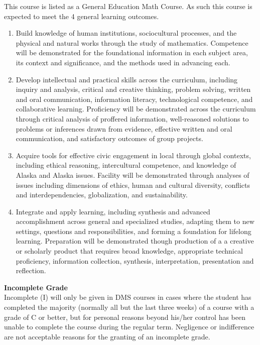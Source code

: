 \documentclass[12pt]{article}
\renewcommand{\emph}[1]{\textsf{\textbf{#1}}}
\newcommand{\localhead}[1]{\par\smallskip\textbf{#1}\nobreak\\}%
\def\subheading#1{\localhead{\emph{#1}}}
\begin{document}
This course is listed as a General Education Math Course. As such this course is expected to meet the 4 general learning outcomes. 

\begin{enumerate}
\item Build knowledge of human institutions, sociocultural processes, and the physical and natural works through the study of mathematics.  Competence will be demonstrated for the foundational information in each subject area, its context and significance, and the methods used in advancing each.

\item Develop intellectual and practical skills across the curriculum, including inquiry and analysis, critical and creative thinking, problem solving, written and oral communication, information literacy, technological competence, and collaborative learning. Proficiency will be demonstrated across the curriculum through critical analysis of proffered information, well-reasoned solutions to problems or inferences drawn from evidence, effective written and oral communication, and satisfactory outcomes of group projects.

\item Acquire tools for effective civic engagement in local through global contexts, including ethical reasoning, intercultural competence, and knowledge of Alaska and Alaska issues.  Facility will be demonstrated through analyses of issues including dimensions of ethics, human and cultural diversity, conflicts and interdependencies, globalization, and sustainability.   

\item Integrate and apply learning, including synthesis and advanced accomplishment across general and specialized studies, adapting them to new settings, questions and responsibilities, and forming a foundation for lifelong learning. Preparation will be demonstrated though production of a a creative or scholarly product that requires broad knowledge, appropriate technical proficiency, information collection, synthesis, interpretation, presentation and reflection.
\end{enumerate}

\subheading{Incomplete Grade} 
Incomplete (I) will only be given in
  DMS courses in cases where
  the student has completed the majority (normally all but the last
  three weeks) of a course with a grade of C or better, but for
  personal reasons beyond his/her control has been unable to complete
  the course during the regular term. Negligence or indifference are
  not acceptable reasons for the granting of an incomplete
  grade. 
\end{document}
